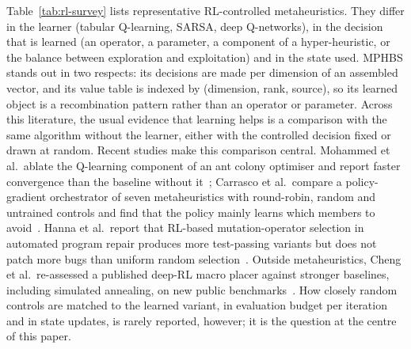 \documentclass[11pt]{article}
\theoremstyle{definition}
\theoremstyle{remark}
\begin{document}
Table~\ref{tab:rl-survey} lists representative RL-controlled metaheuristics. They differ in the learner (tabular Q-learning,
SARSA, deep Q-networks), in the decision that is learned (an operator, a parameter, a component of a hyper-heuristic, or
the balance between exploration and exploitation) and in the state used. MPHBS stands out in two respects: its decisions
are made per dimension of an assembled vector, and its value table is indexed by (dimension, rank, source), so its learned
object is a recombination pattern rather than an operator or parameter. Across this literature, the usual evidence that
learning helps is a comparison with the same algorithm without the learner, either with the controlled decision fixed or
drawn at random. Recent studies make this comparison central. Mohammed et al.\ ablate the Q-learning component of an
ant colony optimiser and report faster convergence than the baseline without it~\citep{mohammed2026qlaco}; Carrasco et al.\
compare a policy-gradient orchestrator of seven metaheuristics with round-robin, random and untrained controls and find
that the policy mainly learns which members to avoid~\citep{carrasco2026orchestration}. Hanna et al.\ report that RL-based
mutation-operator selection in automated program repair produces more test-passing variants but does not patch more bugs
than uniform random selection~\citep{hanna2025apr}. Outside metaheuristics, Cheng et al.\ re-assessed a published deep-RL
macro placer against stronger baselines, including simulated annealing, on new public benchmarks~\citep{cheng2026macro}.
How closely random controls are matched to the learned variant, in evaluation budget per iteration and in state updates,
is rarely reported, however; it is the question at the centre of this paper.
\end{document}
